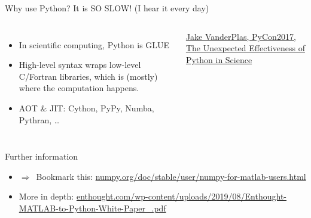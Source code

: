\documentclass[usepdftitle=false, aspectratio=169]{beamer}
\newcommand{\dra}{\ensuremath{\Rightarrow }~}
\begin{document}
\begin{frame}
  {Why use Python? It is SO SLOW! (I hear it every day)}

  \begin{columns}
    \begin{itemize}
      \item In scientific computing, \alert{Python is GLUE}
      \item High-level syntax wraps low-level C/Fortran libraries, which is
        (mostly) where the computation happens.
      \item AOT \& JIT: Cython, PyPy, Numba, Pythran, \ldots
    \end{itemize}

  \tiny
  \href{https://files.speakerdeck.com/presentations/1083b290db884f2ab5d04eb98580be94/PyCon_2017.pdf}%
  {Jake VanderPlas, PyCon2017, The Unexpected Effectiveness of Python in
  Science}
  \end{columns}

\end{frame}

\begin{frame}
  {Further information}

  \begin{itemize}\itemsep .5cm
    \item \dra Bookmark this:
      \href{https://numpy.org/doc/stable/user/numpy-for-matlab-users.html}%
      {numpy.org/doc/stable/user/numpy-for-matlab-users.html}
    \item More in depth:
      \href{https://www.enthought.com/wp-content/uploads/2019/08/Enthought-MATLAB-to-Python-White-Paper_.pdf}
      {enthought.com/wp-content/uploads/2019/08/Enthought-MATLAB-to-Python-White-Paper\_.pdf}
  \end{itemize}

\end{frame}
\end{document}

